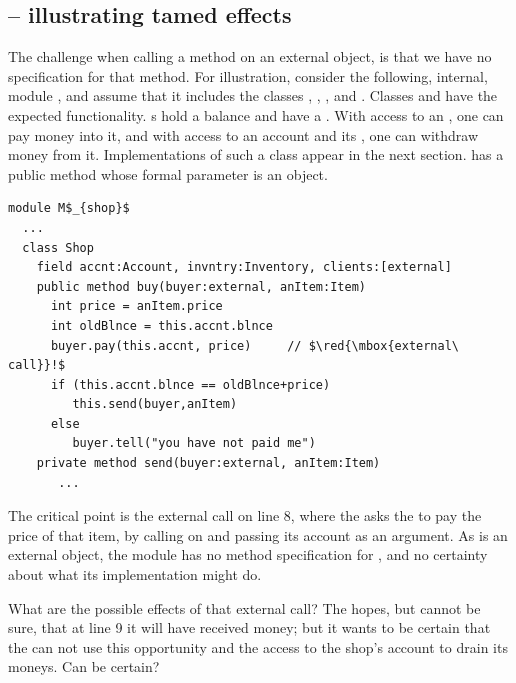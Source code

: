  

\subsection*{ -- illustrating tamed effects} %
\label{sec:how}
\label{sec:shop}

The challenge when calling a method on an external object, is that we have no specification for that method. 
 For illustration, consider the following, internal, module \Mshop, and assume that it includes the classes , , , and . 
Classes  { and  have the expected functionality. 
s hold a balance and have a \password. 
With access to an , %
one  can pay money into it, 
and with access to an account  and its \password, one can withdraw money from it.
Implementations of such a class  appear in the next section.
}
   has  a public method  whose formal parameter  is an    object. 

\begin{lstlisting}[mathescape=true, language=Chainmail, frame=lines]
module M$_{shop}$
  ...   
  class Shop
    field accnt:Account, invntry:Inventory, clients:[external]      
    public method buy(buyer:external, anItem:Item)
      int price = anItem.price
      int oldBlnce = this.accnt.blnce
      buyer.pay(this.accnt, price)     // $\red{\mbox{external\ call}}!$
      if (this.accnt.blnce == oldBlnce+price)  
         this.send(buyer,anItem)
      else
         buyer.tell("you have not paid me")      
    private method send(buyer:external, anItem:Item)  
       ...         
\end{lstlisting}
 

The critical point is the external call on line 8,   {where the  asks the  to pay the price of that item,
by calling   on  and passing its account as an argument.
As  is an external object, the module \Mshop has no method specification for , and no 
certainty about what its implementation %
might do. 
}

{What are the possible effects of that external call?}
{The  hopes, but cannot be sure, that at line 9  it  will have received money; but 
it wants to be certain  that   the  can not use this opportunity and the access to the 
shop's account  to drain its moneys.
Can   be certain?}


